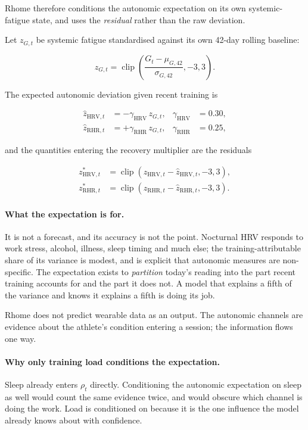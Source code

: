 \documentclass[11pt]{article}
\begin{document}
Rhome therefore conditions the autonomic expectation on its own systemic-fatigue state, and uses the \emph{residual} rather than the raw deviation.

Let $z_{G,t}$ be systemic fatigue standardised against its own 42-day rolling baseline:

\begin{equation}
z_{G,t}=\operatorname{clip}\left(\frac{G_t-\mu_{G,42}}{\sigma_{G,42}},-3,3\right).
\end{equation}

The expected autonomic deviation given recent training is

\begin{align}
\hat z_{\mathrm{HRV},t}&=-\gamma_{\mathrm{HRV}}\,z_{G,t}, & \gamma_{\mathrm{HRV}}&=0.30,\\
\hat z_{\mathrm{RHR},t}&=+\gamma_{\mathrm{RHR}}\,z_{G,t}, & \gamma_{\mathrm{RHR}}&=0.25,
\end{align}

and the quantities entering the recovery multiplier are the residuals

\begin{align}
z^{\ast}_{\mathrm{HRV},t}&=\operatorname{clip}\left(z_{\mathrm{HRV},t}-\hat z_{\mathrm{HRV},t},-3,3\right),\\
z^{\ast}_{\mathrm{RHR},t}&=\operatorname{clip}\left(z_{\mathrm{RHR},t}-\hat z_{\mathrm{RHR},t},-3,3\right).
\end{align}

\paragraph{What the expectation is for.} It is not a forecast, and its accuracy is not the point. Nocturnal HRV responds to work stress, alcohol, illness, sleep timing and much else; the training-attributable share of its variance is modest, and \cite{bellenger2016} is explicit that autonomic measures are non-specific. The expectation exists to \emph{partition} today's reading into the part recent training accounts for and the part it does not. A model that explains a fifth of the variance and knows it explains a fifth is doing its job.

Rhome does not predict wearable data as an output. The autonomic channels are evidence about the athlete's condition entering a session; the information flows one way.

\paragraph{Why only training load conditions the expectation.} Sleep already enters $\rho_t$ directly. Conditioning the autonomic expectation on sleep as well would count the same evidence twice, and would obscure which channel is doing the work. Load is conditioned on because it is the one influence the model already knows about with confidence.
\end{document}
